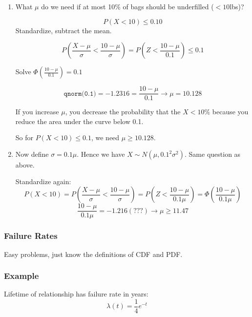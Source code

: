 \documentclass{article}
\newcommand{\var}{\sigma^2}
\begin{document}
\begin{enumerate}
\item What $\mu$ do we need if at most 10\% of bags should be underfilled ($<10$lbs)?

$$ P(X < 10) \leq 0.10 $$
Standardize, subtract the mean.

$$P(\frac{X -\mu}{\sigma} < \frac{10-\mu}{\sigma}) = P(Z < \frac{10-\mu}{0.1}) \leq 0.1$$

Solve $\Phi(\frac{10-\mu}{0.1}) = 0.1$ 

$$\texttt{qnorm(0.1)} = -1.2316 = \frac{10-\mu}{0.1} \rightarrow \mu=10.128$$

If you increase $\mu$, you decrease the probability that the $X < 10\%$ because you reduce the area under the curve below 0.1.

So for $P(X < 10) \leq 0.1$, we need $\mu \geq 10.128$.

\item Now define $\sigma=0.1 \mu$. Hence we have $X \sim N(\mu, 0.1^2\var)$. Same question as above.

Standardize again: $$ P(X < 10) = P \left( \frac{X -\mu}{\sigma} < \frac{10-\mu}{\sigma} \right) = P \left(Z < \frac{10-\mu}{0.1 \mu} \right) = \Phi \left( \frac{10-\mu}{0.1 \mu} \right)$$
$$ \frac{10-\mu}{0.1\mu} = -1.216 (???) \rightarrow \mu \geq 11.47 $$



\end{enumerate}

\subsubsection{Failure Rates}

Easy problems, just know the definitions of CDF and PDF. 

\subsubsection*{Example}

Lifetime of relationship has failure rate in years: $$\lambda(t) = \frac{1}{4} e^{-t}$$
\end{document}
